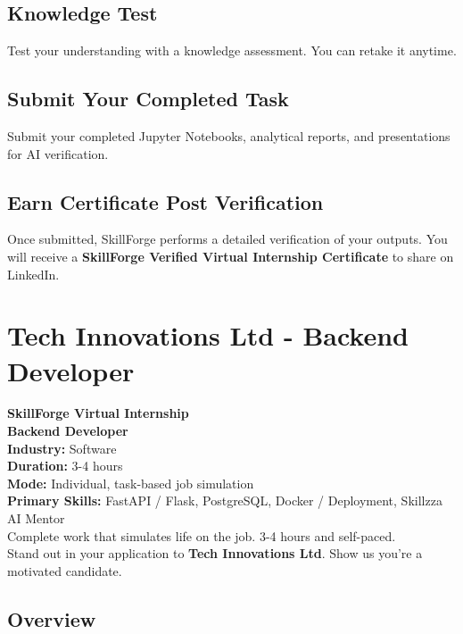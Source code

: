 \documentclass{article}
\begin{document}
\subsection*{Knowledge Test}
Test your understanding with a knowledge assessment. You can retake it anytime.\\

\subsection*{Submit Your Completed Task}
Submit your completed Jupyter Notebooks, analytical reports, and presentations for AI verification.\\

\subsection*{Earn Certificate Post Verification}
Once submitted, SkillForge performs a detailed verification of your outputs. You will receive a \textbf{SkillForge Verified Virtual Internship Certificate} to share on LinkedIn.\\

\newpage

\section{Tech Innovations Ltd - Backend Developer}

\textbf{SkillForge Virtual Internship} \\
\textbf{Backend Developer} \\

\textbf{Industry:} Software \\
\textbf{Duration:} 3-4 hours \\
\textbf{Mode:} Individual, task-based job simulation \\
\textbf{Primary Skills:} FastAPI / Flask, PostgreSQL, Docker / Deployment, Skillzza AI Mentor \\

Complete work that simulates life on the job. 3-4 hours and self-paced. \\
Stand out in your application to \textbf{Tech Innovations Ltd}. Show us you're a motivated candidate. \\

\subsection*{Overview}
\end{document}
